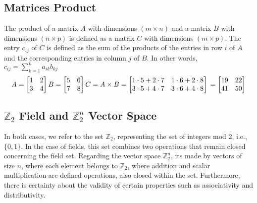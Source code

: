 \subsection{Matrices Product}
The product of a matrix $A$ with dimensions $(m \times n)$ and a matrix $B$ with dimensions $(n \times p)$ is defined as a matrix $C$ with dimensions $(m \times p)$. The entry $c_{ij}$ of $C$ is defined as the sum of the products of the entries in row $i$ of $A$ and the corresponding entries in column $j$ of $B$. In other words, $c_{ij} = \sum_{k=1}^n a_{ik} b_{kj}$
$$
A = \begin{bmatrix}
1 & 2 \\
3 & 4
\end{bmatrix} \\
B = \begin{bmatrix}
5 & 6 \\
7 & 8
\end{bmatrix} \\
C = A \times B \\
= \begin{bmatrix}
1 \cdot 5 + 2 \cdot 7 & 1 \cdot 6 + 2 \cdot 8 \\
3 \cdot 5 + 4 \cdot 7 & 3 \cdot 6 + 4 \cdot 8
\end{bmatrix} \\
= \begin{bmatrix}
19 & 22 \\
41 & 50
\end{bmatrix}
$$

\subsection{$\mathbb{Z}_2$ Field and $\mathbb{Z}_2^n$ Vector Space}
In both cases, we refer to the set $\mathbb{Z}_2$, representing the set of 
integers  mod 2, i.e., $\{0, 1\}$. 
In the case of fields, this set combines two operations that remain closed 
concerning the field set. Regarding the vector space $\mathbb{Z}_2^n$, its 
made by vectors of size $n$, where each element belongs to $\mathbb{Z}_2$, 
where addition and scalar multiplication are defined operations, also 
closed within the set. Furthermore, there is certainty about the validity 
of certain properties such as associativity and distributivity.

